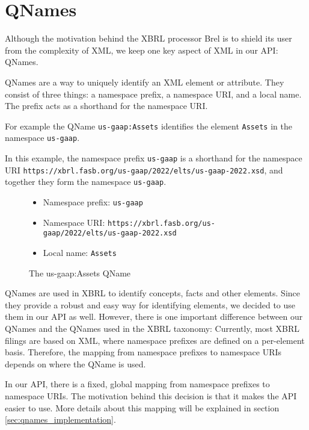 \section{QNames}
\label{sec:qnames}

Although the motivation behind the XBRL processor Brel is to shield its user from the complexity of XML, 
we keep one key aspect of XML in our API: QNames.

QNames are a way to uniquely identify an XML element or attribute. 
They consist of three things: a namespace prefix, a namespace URI, and a local name.
The prefix acts as a shorthand for the namespace URI.

For example the QName \texttt{us-gaap:Assets} identifies the element \texttt{Assets} in the namespace \texttt{us-gaap}.

In this example, the namespace prefix \texttt{us-gaap} is a shorthand for the namespace URI \texttt{https://xbrl.fasb.org/us-gaap/2022/elts/us-gaap-2022.xsd}, 
and together they form the namespace \texttt{us-gaap}.

\begin{figure}[H]
    \caption{The us-gaap:Assets QName}
    \label{fig:qname_us_gaap_assets}
    \begin{itemize}
        \item Namespace prefix: \texttt{us-gaap}
        \item Namespace URI: \texttt{https://xbrl.fasb.org/us-gaap/2022/elts/us-gaap-2022.xsd}
        \item Local name: \texttt{Assets}
    \end{itemize}
\end{figure}

QNames are used in XBRL to identify concepts, facts and other elements. Since they provide a robust and easy way for identifying elements,
we decided to use them in our API as well. However, there is one important difference between our QNames and the QNames used in the XBRL taxonomy:
Currently, most XBRL filings are based on XML, where namespace prefixes are defined on a per-element basis.
Therefore, the mapping from namespace prefixes to namespace URIs depends on where the QName is used. 

In our API, there is a fixed, global mapping from namespace prefixes to namespace URIs.
The motivation behind this decision is that it makes the API easier to use.
More details about this mapping will be explained in section \ref{sec:qnames_implementation}.


